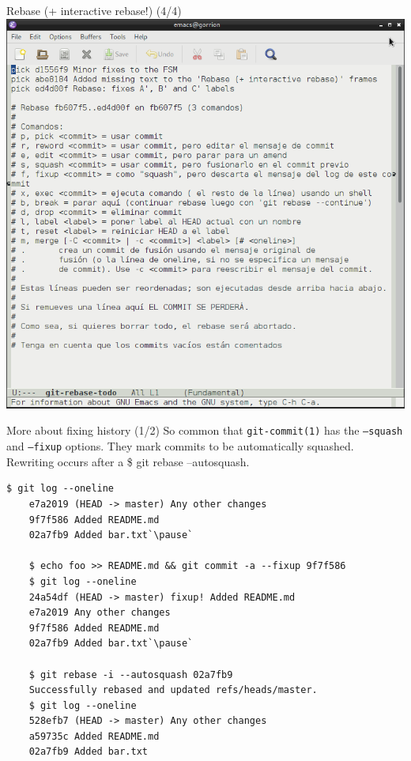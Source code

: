 \begin{frame}{Rebase (+ interactive rebase!) (4/4)}
  \centering\includegraphics[height=.78\textheight]{img/git-rebase_-i.png}
\end{frame}

\begin{frame}[fragile]{More about fixing history (1/2)}
  So common that \texttt{git-commit(1)} has the \texttt{--squash} and \texttt{--fixup} options. They mark commits to be automatically squashed. Rewriting occurs after a {\ttfamily\scriptsize\$ git rebase --autosquash}.
  \pause
  \begin{lstlisting}[style=bash]
    $ git log --oneline
    e7a2019 (HEAD -> master) Any other changes
    9f7f586 Added README.md
    02a7fb9 Added bar.txt`\pause`

    $ echo foo >> README.md && git commit -a --fixup 9f7f586
    $ git log --oneline
    24a54df (HEAD -> master) fixup! Added README.md
    e7a2019 Any other changes
    9f7f586 Added README.md
    02a7fb9 Added bar.txt`\pause`

    $ git rebase -i --autosquash 02a7fb9
    Successfully rebased and updated refs/heads/master.
    $ git log --oneline
    528efb7 (HEAD -> master) Any other changes
    a59735c Added README.md
    02a7fb9 Added bar.txt
  \end{lstlisting}

  \gitRebaseWarning
\end{frame}

